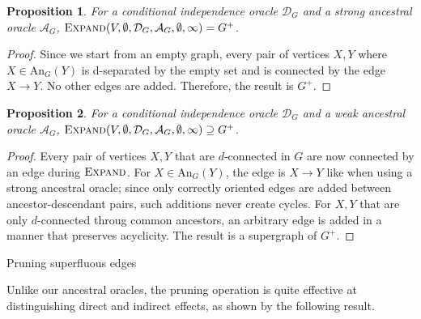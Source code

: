 \documentclass{uai2025} %
\newtheorem{proposition}{Proposition}
\begin{document}
\begin{proposition}
For a conditional independence oracle
 $\mathcal{D}_G$ and a strong ancestral oracle $\mathcal{A}_G$, 
$\textsc{Expand}(V,\emptyset,\mathcal{D}_G,\mathcal{A}_G, \emptyset, \infty)=G^+$.
\label{prop:strongexpand}
\end{proposition}

\begin{proof}
Since we start from an empty graph, every pair of vertices $X, Y$ where
 $X \in \textrm{An}_G(Y)$ is d-separated by the empty set and is
 connected by the edge $X \to Y$. No other edges are added. Therefore, 
the result is $G^+$. 
\end{proof}

\begin{proposition}
For a conditional independence oracle
 $\mathcal{D}_G$ and a weak ancestral oracle $\mathcal{A}_G$, 
$\textsc{Expand}(V,\emptyset,\mathcal{D}_G,\mathcal{A}_G, \emptyset, \infty)
\supseteq G^+$.
\label{prop:weakexpand}
\end{proposition}

\begin{proof}
Every pair of vertices $X, Y$ that are $d$-connected 
in $G$ are now connected by an edge 
during $\textsc{Expand}$. For $X \in \textrm{An}_G(Y)$, the edge is 
$X \to Y$ like when using a strong ancestral oracle; 
since only correctly oriented
edges are added between ancestor-descendant pairs, 
such additions never create cycles.
For $X, Y$ that are only $d$-connected throug common ancestors, 
an arbitrary edge is added in a manner that preserves acyclicity.
The result is a supergraph of $G^+$.
\end{proof}


\begin{algorithm}[h]
\DontPrintSemicolon
\SetAlgoLined

\caption{Pruning superfluous edges}
\label{algo:prune}
\end{algorithm}

Unlike our ancestral oracles, the pruning operation is 
quite effective at distinguishing
direct and indirect effects, as shown by the following result.
\end{document}
